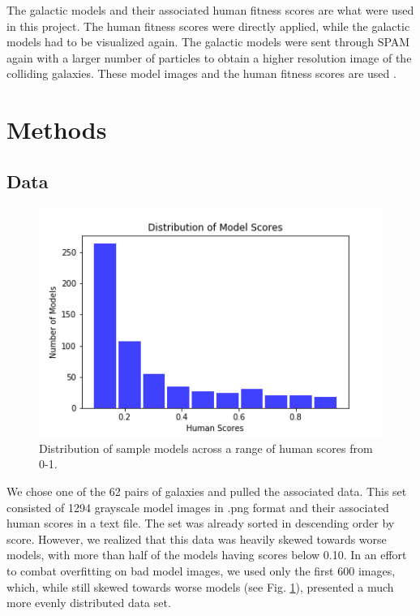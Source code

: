 \documentclass[conference]{IEEEtran}
\begin{document}
The galactic models and their associated human fitness
scores are what were used in this project. The human fitness
scores were directly applied, while the galactic models had to
be visualized again. The galactic models were sent through
SPAM again with a larger number of particles to obtain a 
higher resolution image of the colliding galaxies. These model
images and the human fitness scores are used \cite{WallinJSPAM}\cite{WallinGalaxyZoo}.


\section{Methods}

\subsection{Data}

\begin{figure}[htbp]
\centerline{\includegraphics[width=0.75\linewidth]{./Images/distribution.png}}
\caption{Distribution of sample models across a range of human scores from 0-1.}
\label{fig:distribution}
\end{figure}

We chose one of the 62 pairs of galaxies and pulled the associated data. This set consisted of 1294 grayscale model images in .png format and their associated human scores in a text file. The set was already sorted in descending order by score. However, we realized that this data was heavily skewed towards worse models, with more than half of the models having scores below 0.10. In an effort to combat overfitting on bad model images, we used only the first 600 images, which, while still skewed towards worse models (see Fig. \ref{fig:distribution}), presented a much more evenly distributed data set.
\end{document}
